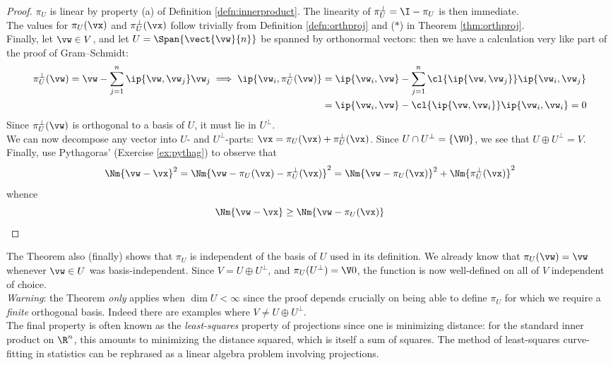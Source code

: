 \begin{proof}
$\pi_U$ is linear by property (a) of Definition \ref{defn:innerproduct}. The linearity of $\pi_U^\perp=\I-\pi_U$ is then immediate.\\[5pt]
The values for $\pi_U(\vx)$ and $\pi^\perp_U(\vx)$ follow trivially from Definition \ref{defn:orthproj} and ($\ast$) in Theorem \ref{thm:orthproj}.\\[5pt]
Finally, let $\vw\in V$, and let $U=\Span\{\vect{\vw}{n}\}$ be spanned by orthonormal vectors: then we have a calculation very like part of the proof of Gram--Schmidt:
\begin{align*}
\pi_U^\perp(\vw)=\vw-\sum_{j=1}^n\ip{\vw,\vw_j}\vw_j \implies \ip{\vw_i,\pi_U^\perp(\vw)} &= \ip{\vw_i,\vw}-\sum_{j=1}^n\cl{\ip{\vw,\vw_j}}\ip{\vw_i,\vw_j}\\
&=\ip{\vw_i,\vw}-\cl{\ip{\vw,\vw_i}}\ip{\vw_i,\vw_i} =0
\end{align*}
Since $\pi_U^\perp(\vw)$ is orthogonal to a basis of $U$, it must lie in $U^\perp$.\\[5pt]
We can now decompose any vector into $U$- and $U^\perp$-parts: $\vx=\pi_U(\vx)+\pi_U^\perp(\vx)$. Since $U\cap U^\perp=\{\V0\}$, we see that $U\oplus U^\perp=V$.\\[5pt]
Finally, use Pythagoras' (Exercise \ref{ex:pythag}) to observe that
\[\Nm{\vw-\vx}^2=\Nm{\vw-\pi_U(\vx)-\pi_U^\perp(\vx)}^2=\Nm{\vw-\pi_U(\vx)}^2+\Nm{\pi_U^\perp(\vx)}^2\]
whence
\[\Nm{\vw-\vx}\ge \Nm{\vw-\pi_U(\vx)}\tag*{\qedhere}\]
\end{proof}

The Theorem also (finally) shows that $\pi_U$ is independent of the basis of $U$ used in its definition. We already know that $\pi_U(\vw)=\vw$ whenever $\vw\in U$ was basis-independent. Since $V=U\oplus U^\perp$, and $\pi_U(U^\perp)=\V0$, the function is now well-defined on all of $V$ independent of choice.\\[-5pt]

\emph{Warning}: the Theorem \emph{only} applies when $\dim U<\infty$ since the proof depends crucially on being able to define $\pi_U$ for which we require a \emph{finite} orthogonal basis. Indeed there are examples where $V\neq U\oplus U^\perp$.\\[-5pt]

The final property is often known as the \emph{least-squares} property of projections since one is minimizing distance: for the standard inner product on $\R^n$, this amounts to minimizing the distance squared, which is itself a sum of squares. The method of least-squares curve-fitting in statistics can be rephrased as a linear algebra problem involving projections.
  
